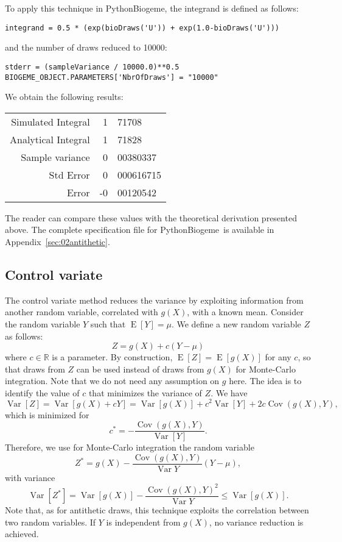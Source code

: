 \documentclass[12pt,a4paper]{article}
\newcommand{\R}{\mathbb{R}}
\newcommand{\expect}{\operatorname{E}}
\newcommand{\var}{\operatorname{Var}}
\newcommand{\cov}{\operatorname{Cov}}
\newcommand{\PBIOGEME}{PythonBiogeme}
\begin{document}
To apply this technique in \PBIOGEME, the integrand is defined as
follows:
\begin{lstlisting}
integrand = 0.5 * (exp(bioDraws('U')) + exp(1.0-bioDraws('U')))
\end{lstlisting}
and the number of draws reduced to 10000:
\begin{lstlisting}
stderr = (sampleVariance / 10000.0)**0.5
BIOGEME_OBJECT.PARAMETERS['NbrOfDraws'] = "10000"
\end{lstlisting}
We obtain the following results:
\begin{center}
\begin{tabular}{rr@{.}l}
Simulated Integral & 1&71708 \\
Analytical Integral &1&71828 \\
Sample variance & 0&00380337 \\
Std Error & 0&000616715 \\
Error & -0&00120542 \\
\end{tabular}
\end{center}
The reader can compare these values with the theoretical derivation
presented above. 
The complete specification file for \PBIOGEME\ is available in Appendix~\ref{sec:02antithetic}.

\subsection{Control variate}
\label{sec:cv}
The control variate method reduces the variance by exploiting
information from another random variable, correlated with $g(X)$, with a
known mean. Consider the random variable $Y$ such that
$\expect[Y]=\mu$.
We define a new random variable $Z$ as follows:
\begin{equation}
Z = g(X) + c(Y-\mu)
\end{equation}
where $c\in \R$ is a parameter. By construction, $\expect[Z]=\expect[g(X)]$
for any $c$, so that draws from $Z$ can be used instead of draws from
$g(X)$ for Monte-Carlo integration. Note that we do not need any
assumption on $g$ here.  The idea is to identify the value of
$c$ that minimizes the variance of $Z$. 
We have
\begin{equation}
\var[Z]=\var[g(X)+cY] = \var[g(X)] + c^2 \var[Y] + 2c\cov(g(X),Y),
\end{equation}
which is minimized for
\begin{equation}
c^* = -\frac{\cov(g(X),Y)}{\var[Y]}.
\end{equation}
Therefore, we use for Monte-Carlo integration the random variable
\begin{equation}
Z^* = g(X)  -\frac{\cov(g(X),Y)}{\var{Y}}(Y-\mu),
\end{equation}
with variance
\begin{equation}
\var[Z^*] = \var[g(X)] - \frac{\cov(g(X),Y)^2}{\var{Y}} \leq \var[g(X)].
\end{equation}
Note that, as for antithetic draws, this technique exploits the
correlation between two random variables. If $Y$ is independent from
$g(X)$, no variance reduction is achieved. 
\end{document}
